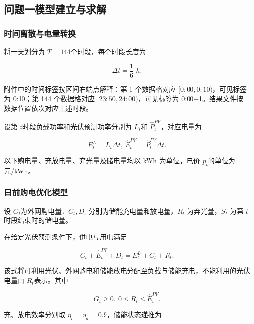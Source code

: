 \documentclass[withoutpreface,bwprint]{cumcmthesis}
\begin{document}
\subsection{问题一模型建立与求解}

\subsubsection{时间离散与电量转换}

将一天划分为 \(T = 144\)个时段，每个时段长度为

\begin{equation}\Delta t = \frac{1}{6}\text{~}h.\end{equation}

附件中的时间标签按区间右端点解释：第 1 个数据格对应
\([0\!:\!00,0\!:\!10)\)，可见标签为 0:10；第 144 个数据格对应
\([23\!:\!50,24\!:\!00)\)，可见标签为 0:00+1。结果文件按数据位置依次对应上述时段。

设第 \(t\)时段负载功率和光伏预测功率分别为 \(L_{t}\)和
\({\widehat{P}}_{t}^{PV}\)，对应电量为

\begin{equation}E_{t}^{L} = L_{t}\Delta t,\ {\widehat{E}}_{t}^{PV} = {\widehat{P}}_{t}^{PV}\Delta t.\end{equation}

以下购电量、充放电量、弃光量及储电量均以 kWh 为单位，电价
\(p_{t}\)的单位为元/kWh。

\subsubsection{日前购电优化模型}

设 \(G_{t}\)为外网购电量，\(C_{t},D_{t}\)
分别为储能充电量和放电量，\(R_{t}\) 为弃光量，\(S_{t}\) 为第
\(t\)时段结束时的储电量。

在给定光伏预测条件下，供电与用电满足

\begin{equation}G_{t} + {\widehat{E}}_{t}^{PV} + D_{t} = E_{t}^{L} + C_{t} + R_{t}.\end{equation}

该式将可利用光伏、外网购电和储能放电分配至负载与储能充电，不能利用的光伏电量由
\(R_{t}\)表示。其中

\begin{equation}G_{t} \geq 0,\ 0 \leq R_{t} \leq {\widehat{E}}_{t}^{PV}.\end{equation}

充、放电效率分别取 \(\eta_{c} = \eta_{d} = 0.9\)，储能状态递推为
\end{document}
